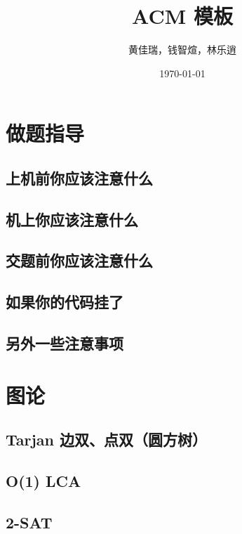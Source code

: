 \documentclass[10pt, a4paper, oneside]{ctexart}
\title{ACM 模板}
\author{黄佳瑞，钱智煊，林乐逍}
\date{\today}
\begin{document}
    \scriptsize
    \maketitle
    \newpage
    
    \begin{multicols}{2}
        \tableofcontents
        \newpage

        \section{做题指导}
        \subsection{上机前你应该注意什么}
        
        \subsection{机上你应该注意什么}
        
        \subsection{交题前你应该注意什么}
        
        \subsection{如果你的代码挂了}
        
        \subsection{另外一些注意事项}
        

        \newpage
        \section{图论}
        \subsection{Tarjan 边双、点双（圆方树）}
        
        \subsection{O(1) LCA}
        
        \subsection{2-SAT}
        

\end{multicols}
\end{document}
